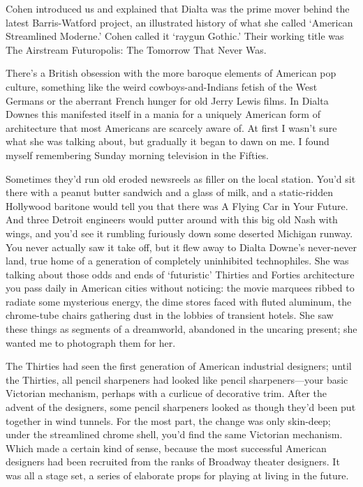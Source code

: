 Cohen introduced us and explained that Dialta was the prime mover behind the latest Barris-Watford project, an illustrated history of what she called `American Streamlined Moderne.' Cohen called it `raygun Gothic.' Their working title was The Airstream Futuropolis: The Tomorrow That Never Was.

There's a British obsession with the more baroque elements of American pop culture, something like the weird cowboys-and-Indians fetish of the West Germans or the aberrant French hunger for old Jerry Lewis films. In Dialta Downes this manifested itself in a mania for a uniquely American form of architecture that most Americans are scarcely aware of. At first I wasn't sure what she was talking about, but gradually it began to dawn on me. I found myself remembering Sunday morning television in the Fifties.

Sometimes they'd run old eroded newsreels as filler on the local station. You'd sit there with a peanut butter sandwich and a glass of milk, and a static-ridden Hollywood baritone would tell you that there was A Flying Car in Your Future. And three Detroit engineers would putter around with this big old Nash with wings, and you'd see it rumbling furiously down some deserted Michigan runway. You never actually saw it take off, but it flew away to Dialta Downe's never-never land, true home of a generation of completely uninhibited technophiles. She was talking about those odds and ends of `futuristic' Thirties and Forties architecture you pass daily in American cities without noticing: the movie marquees ribbed to radiate some mysterious energy, the dime stores faced with fluted aluminum, the chrome-tube chairs gathering dust in the lobbies of transient hotels. She saw these things as segments of a dreamworld, abandoned in the uncaring present; she wanted me to photograph them for her.

The Thirties had seen the first generation of American industrial designers; until the Thirties, all pencil sharpeners had looked like pencil sharpeners—your basic Victorian mechanism, perhaps with a curlicue of decorative trim. After the advent of the designers, some pencil sharpeners looked as though they'd been put together in wind tunnels. For the most part, the change was only skin-deep; under the streamlined chrome shell, you'd find the same Victorian mechanism. Which made a certain kind of sense, because the most successful American designers had been recruited from the ranks of Broadway theater designers. It was all a stage set, a series of elaborate props for playing at living in the future.

